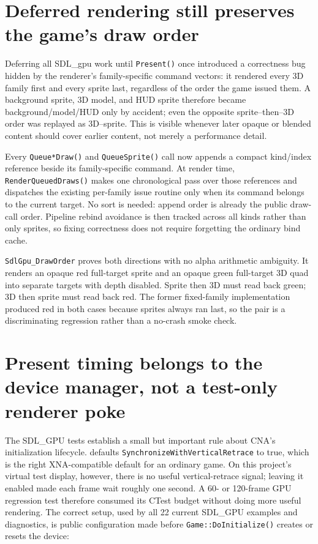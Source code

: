\section{Deferred rendering still preserves the game's draw order}

Deferring all SDL\_gpu work until \texttt{Present()} once introduced a correctness bug hidden by
the renderer's family-specific command vectors: it rendered every 3D family first and every sprite
last, regardless of the order the game issued them. A background sprite, 3D model, and HUD sprite
therefore became background/model/HUD only by accident; even the opposite sprite--then--3D order
was replayed as 3D--sprite. This is visible whenever later opaque or blended content should cover
earlier content, not merely a performance detail.

Every \texttt{Queue*Draw()} and \texttt{QueueSprite()} call now appends a compact kind/index
reference beside its family-specific command. At render time,
\texttt{RenderQueuedDraws()} makes one chronological pass over those references and dispatches
the existing per-family issue routine only when its command belongs to the current target. No
sort is needed: append order is already the public draw-call order. Pipeline rebind avoidance is
then tracked across all kinds rather than only sprites, so fixing correctness does not require
forgetting the ordinary bind cache.

\texttt{SdlGpu\_DrawOrder} proves both directions with no alpha arithmetic ambiguity. It renders
an opaque red full-target sprite and an opaque green full-target 3D quad into separate targets
with depth disabled. Sprite then 3D must read back green; 3D then sprite must read back red.
The former fixed-family implementation produced red in both cases because sprites always ran
last, so the pair is a discriminating regression rather than a no-crash smoke check.

\section{Present timing belongs to the device manager, not a test-only renderer poke}

The SDL\_GPU tests establish a small but important rule about CNA's initialization lifecycle.
 defaults \texttt{SynchronizeWithVerticalRetrace} to true,
which is the right XNA-compatible default for an ordinary game. On this project's virtual test
display, however, there is no useful vertical-retrace signal; leaving it enabled made each frame
wait roughly one second. A 60- or 120-frame GPU regression test therefore consumed its CTest
budget without doing more useful rendering. The correct setup, used by all 22 current
SDL\_GPU examples and diagnostics, is public configuration made before
\texttt{Game::DoInitialize()} creates or resets the device:

